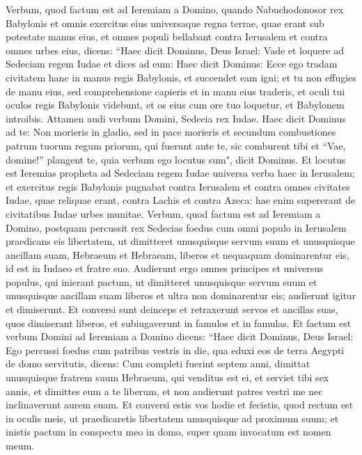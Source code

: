 \begin{biblechapter}  
\verse Verbum, quod factum est ad Ieremiam a Domino, quando Nabuchodonosor rex Babylonis et omnis exercitus eius universaque regna terrae, quae erant sub potestate manus eius, et omnes populi bellabant contra Ierusalem et contra omnes urbes eius, dicens: 
\verse “Haec dicit Dominus, Deus Israel: Vade et loquere ad Sedeciam regem Iudae et dices ad eum: Haec dicit Dominus: Ecce ego tradam civitatem hanc in manus regis Babylonis, et succendet eam igni; 
\verse et tu non effugies de manu eius, sed comprehensione capieris et in manu eius traderis, et oculi tui oculos regis Babylonis videbunt, et os eius cum ore tuo loquetur, et Babylonem introibis. 
\verse Attamen audi verbum Domini, Sedecia rex Iudae. Haec dicit Dominus ad te: Non morieris in gladio, 
\verse sed in pace morieris et secundum combustiones patrum tuorum regum priorum, qui fuerunt ante te, sic comburent tibi et “Vae, domine!” plangent te, quia verbum ego locutus sum", dicit Dominus. 
\verse Et locutus est Ieremias propheta ad Sedeciam regem Iudae universa verba haec in Ierusalem; 
\verse et exercitus regis Babylonis pugnabat contra Ierusalem et contra omnes civitates Iudae, quae reliquae erant, contra Lachis et contra Azeca: hae enim supererant de civitatibus Iudae urbes munitae. 
\verse Verbum, quod factum est ad Ieremiam a Domino, postquam percussit rex Sedecias foedus cum omni populo in Ierusalem praedicans eis libertatem, 
\verse ut dimitteret unusquisque servum suum et unusquisque ancillam suam, Hebraeum et Hebraeam, liberos et nequaquam dominarentur eis, id est in Iudaeo et fratre suo.  
\verse Audierunt ergo omnes principes et universus populus, qui inierant pactum, ut dimitteret unusquisque servum suum et unusquisque ancillam suam liberos et ultra non dominarentur eis; audierunt igitur et dimiserunt. 
\verse Et conversi sunt deinceps et retraxerunt servos et ancillas suas, quos dimiserant liberos, et subiugaverunt in famulos et in famulas. 
\verse Et factum est verbum Domini ad Ieremiam a Domino dicens: 
\verse “Haec dicit Dominus, Deus Israel: Ego percussi foedus cum patribus vestris in die, qua eduxi eos de terra Aegypti de domo servitutis, dicens: 
\verse Cum completi fuerint septem anni, dimittat unusquisque fratrem suum Hebraeum, qui venditus est ei, et serviet tibi sex annis, et dimittes eum a te liberum, et non audierunt patres vestri me nec inclinaverunt aurem suam. 
\verse Et conversi estis vos hodie et fecistis, quod rectum est in oculis meis, ut praedicaretis libertatem unusquisque ad proximum suum; et inistis pactum in conspectu meo in domo, super quam invocatum est nomen meum. 

\end{biblechapter}
